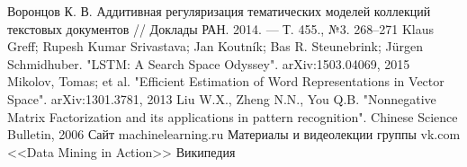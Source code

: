 \documentclass[a4paper,14pt]{extarticle}
\begin{document}
\begin{thebibliography}{@@@@}	
			Воронцов К. В. Аддитивная регуляризация тематических моделей коллекций текстовых документов // Доклады РАН. 2014. — Т. 455., №3. 268–271
			 Klaus Greff; Rupesh Kumar Srivastava; Jan Koutník; Bas R. Steunebrink; Jürgen Schmidhuber. "LSTM: A Search Space Odyssey". arXiv:1503.04069, 2015
			Mikolov, Tomas; et al. "Efficient Estimation of Word Representations in Vector Space". arXiv:1301.3781, 2013
			Liu W.X., Zheng N.N.,  You Q.B. "Nonnegative Matrix Factorization and its applications in pattern recognition". Chinese Science Bulletin, 2006
			Сайт machinelearning.ru
			Материалы и видеолекции группы vk.com <<Data Mining in Action>>
			Википедия
\end{thebibliography}
\end{document}
